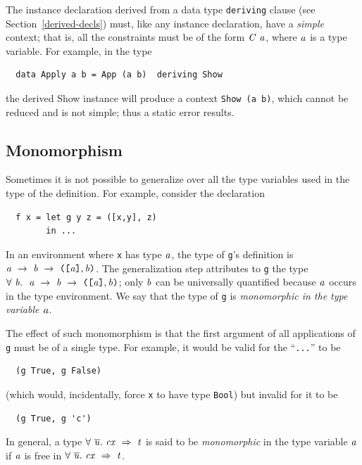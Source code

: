 The instance declaration derived from a data type \mbox{\tt deriving} clause
(see Section~\ref{derived-decls})
must, like any instance declaration, have a {\em simple} context; that is,
all the constraints must be of the form \mbox{$\it C\ a$}, where \mbox{$\it a$} is a type variable.
For example, in the type
\bprog
{\small\begin{verbatim}
  data Apply a b = App (a b)  deriving Show
\end{verbatim}}
\eprog
the derived Show instance will produce a context \mbox{\tt Show\ (a\ b)}, which
cannot be reduced and is not simple; thus a static error results.

\subsection{Monomorphism}
\label{monomorphism}
Sometimes it is not possible to generalize over all the type variables
used in the type of the definition.
For example, consider the declaration\nopagebreak[4]
\bprog
{\small\begin{verbatim}
  f x = let g y z = ([x,y], z)
        in ...
\end{verbatim}}
\eprog
In an environment where \mbox{\tt x} has type \mbox{$\it a$},
the type of \mbox{\tt g}'s definition is 
\mbox{$\it a\ \rightarrow\ b\ \rightarrow\ \makebox{\tt ([}a\makebox{\tt ]},b\makebox{\tt )}$}.
The generalization step attributes to \mbox{\tt g} the type 
\mbox{$\it \forall\ b.~\ a\ \rightarrow\ b\ \rightarrow\ \makebox{\tt ([}a\makebox{\tt ]},b\makebox{\tt )}$};
only \mbox{$\it b$} can be universally quantified because \mbox{$\it a$} occurs in the
type environment.
We say that the type of \mbox{\tt g} is {\em monomorphic in the type variable \mbox{$\it a$}}.

The effect of such monomorphism is that the first argument of all 
applications of \mbox{\tt g} must be of a single type.  
For example, it would be valid for
the ``\mbox{\tt ...}'' to be
\bprog
{\small\begin{verbatim}
  (g True, g False)
\end{verbatim}}
\eprog
(which would, incidentally, force \mbox{\tt x} to have type \mbox{\tt Bool}) but invalid
for it to be 
\bprog
{\small\begin{verbatim}
  (g True, g 'c')
\end{verbatim}}
\eprog
In general, a type \mbox{$\it \forall\ \overline{u}.~cx\ \Rightarrow\ t$}
is said to be {\em monomorphic}
in the type variable \mbox{$\it a$} if \mbox{$\it a$} is free in
\mbox{$\it \forall\ \overline{u}.~cx\ \Rightarrow\ t$}.

